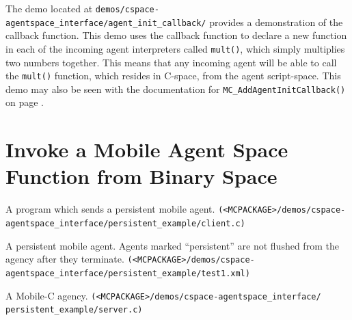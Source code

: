\documentclass[11pt]{report}
\begin{document}
The demo located at \texttt{demos/cspace-agentspace\_interface/agent\_init\_callback/} 
provides a demonstration of the callback function. This demo uses the callback
function to declare a new function in each of the incoming agent interpreters
called \texttt{mult()}, which simply multiplies two numbers together. This
means that any incoming agent will be able to call the \texttt{mult()} function,
which resides in C-space, from the agent script-space. This demo may also be seen with
the documentation for \texttt{MC\_AddAgentInitCallback()} on page \pageref{api:MC_AddAgentInitCallback()}.

\noindent
\section{Invoke a Mobile Agent Space Function from Binary Space}
\begin{Program}[!t]
\begin{center}
   {\footnotesize \linespread{1.0} 
     }
\end{center}
\caption{ A program which sends a persistent mobile agent.
  \texttt{(<MCPACKAGE>/demos/cspace-agentspace\_interface/persistent\_example/client.c)}}
\label{prog:client_ex2.c}
\end{Program}
\begin{Program}[!t]
\begin{center}
   {\footnotesize \linespread{1.0} 
     }
\end{center}
\caption{A persistent mobile agent. Agents marked ``persistent'' are
  not flushed from the agency after they terminate.
    \texttt{(<MCPACKAGE>/demos/cspace-agentspace\_interface/persistent\_example/test1.xml)}}
\label{prog:mobileagent_ex2.xml}
\end{Program}
\begin{Program}[!t]
\begin{center}
   {\footnotesize \linespread{1.0} 
     }
\end{center}
\caption{A Mobile-C agency.
 \texttt{(<MCPACKAGE>/demos/cspace-agentspace\_interface/ persistent\_example/server.c)}}
\label{prog:server_ex2.c}
\end{Program}
\end{document}
